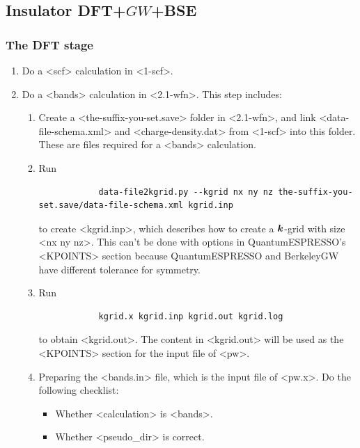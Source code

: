 \documentclass[hyperref, a4paper, 12pt]{report}
\def\texttt#1{<#1>}%
\newcommand{\shortcode}[1]{\texttt{#1}}
\begin{document}
\subsection{Insulator DFT+$GW$+BSE}

\subsubsection{The DFT stage}

\begin{enumerate}
    \item Do a \shortcode{scf} calculation in \shortcode{1-scf}.
    \item Do a \shortcode{bands} calculation in \shortcode{2.1-wfn}. This step includes: 
    \begin{enumerate}
        \item Create a \shortcode{the-suffix-you-set.save} folder in \shortcode{2.1-wfn},
        and link \shortcode{data-file-schema.xml} and \shortcode{charge-density.dat} 
        from \shortcode{1-scf}
        into this folder.
        These are files required for a \shortcode{bands} calculation.
        \item Run  
        \begin{lstlisting}
            data-file2kgrid.py --kgrid nx ny nz the-suffix-you-set.save/data-file-schema.xml kgrid.inp
        \end{lstlisting}
        to create \shortcode{kgrid.inp},
        which describes how to create a $\vb*{k}$-grid with size \shortcode{nx ny nz}.
        This can't be done with options in QuantumESPRESSO's \shortcode{KPOINTS} section 
        because QuantumESPRESSO and BerkeleyGW have different tolerance for symmetry.
        \item Run 
        \begin{lstlisting}
            kgrid.x kgrid.inp kgrid.out kgrid.log
        \end{lstlisting}
        to obtain \shortcode{kgrid.out}.
        The content in \shortcode{kgrid.out} will be used as the \shortcode{KPOINTS} section 
        for the input file of \shortcode{pw}.
        \item Preparing the \shortcode{bands.in} file, which is the input file of \shortcode{pw.x}.
        Do the following checklist:
        \begin{itemize}
            \item Whether \shortcode{calculation} is \shortcode{bands}.
            \item Whether \shortcode{pseudo_dir} is correct.

\end{itemize}
\end{enumerate}
\end{enumerate}
\end{document}
